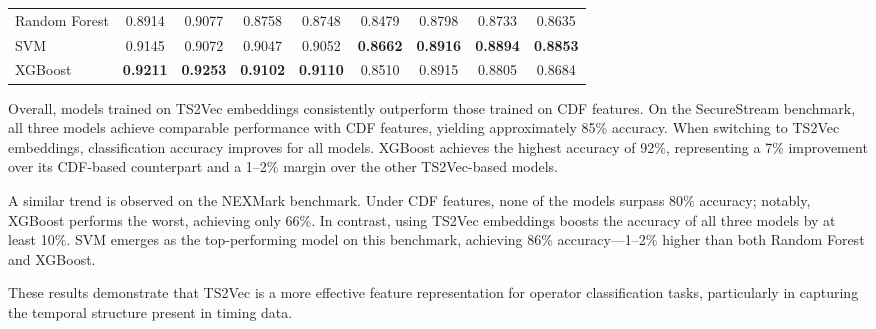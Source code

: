 \begin{table}
\begin{tabular}{lcccccccc}
Random Forest                                        & 0.8914                       & 0.9077                        & 0.8758                     & 0.8748                       & 0.8479                       & 0.8798                        & 0.8733                     & 0.8635                       \\
SVM                                                  & 0.9145                       & 0.9072                        & 0.9047                     & 0.9052                       & \textbf{0.8662}                       & \textbf{0.8916}                        & \textbf{0.8894}                     & \textbf{0.8853}                       \\
XGBoost                                              & \textbf{0.9211}                       & \textbf{0.9253}                        & \textbf{0.9102}                     & \textbf{0.9110}                       & 0.8510                       & 0.8915                        & 0.8805                     & 0.8684                       \\ \hline
\end{tabular}
\end{table}

Overall, models trained on TS2Vec embeddings consistently outperform those trained on CDF features. On the SecureStream benchmark, all three models achieve comparable performance with CDF features, yielding approximately 85\% accuracy. When switching to TS2Vec embeddings, classification accuracy improves for all models. XGBoost achieves the highest accuracy of 92\%, representing a 7\% improvement over its CDF-based counterpart and a 1--2\% margin over the other TS2Vec-based models.

A similar trend is observed on the NEXMark benchmark. Under CDF features, none of the models surpass 80\% accuracy; notably, XGBoost performs the worst, achieving only 66\%. In contrast, using TS2Vec embeddings boosts the accuracy of all three models by at least 10\%. SVM emerges as the top-performing model on this benchmark, achieving 86\% accuracy—1--2\% higher than both Random Forest and XGBoost.

These results demonstrate that TS2Vec is a more effective feature representation for operator classification tasks, particularly in capturing the temporal structure present in timing data.


